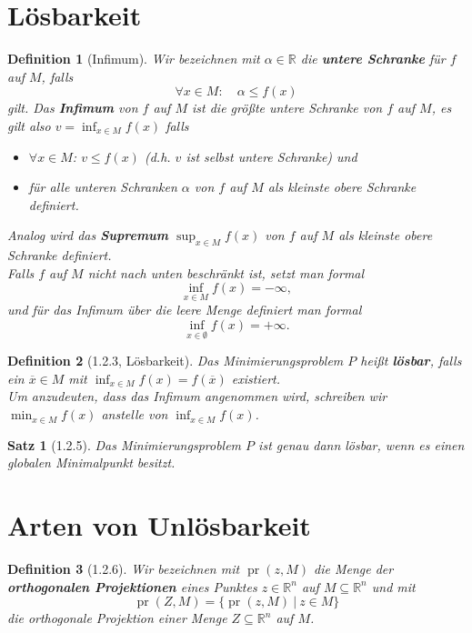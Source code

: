 \documentclass[12pt]{extreport} %
\newcommand{\R}{\mathbb{R}}
\theoremstyle{named}
\theoremstyle{nnamed}
\theoremstyle{itshape}
\newtheorem*{satz}{Satz}
\newtheorem*{definition}{Definition}
\theoremstyle{normal}
\begin{document}
\newpage

\section{Lösbarkeit}

\begin{definition}[Infimum]
	Wir bezeichnen mit $\alpha \in \R$ die \textbf{untere Schranke} für $f$ auf $M$, falls
	$$ \forall x \in M: \quad \alpha \leq f(x) $$
	gilt. Das \textbf{Infimum} von $f$ auf $M$ ist die größte untere Schranke von $f$ auf $M$, es gilt also $v = \inf_{x \in M} f(x)$ falls
	\begin{itemize}
		\item $\forall x \in M$: $v \leq f(x)$ (d.h. $v$ ist selbst untere Schranke) und
		\item für alle unteren Schranken $\alpha$ von $f$ auf $M$ als kleinste obere Schranke definiert.
	\end{itemize}
	Analog wird das \textbf{Supremum} $\sup_{x \in M} f(x)$ von $f$ auf $M$ als kleinste obere Schranke definiert. ~\\
	
	Falls $f$ auf $M$ nicht nach unten beschränkt ist, setzt man formal
	$$ \inf_{x \in M} f(x) = - \infty, $$
	und für das Infimum über die leere Menge definiert man formal
	$$ \inf_{x \in \emptyset} f(x) = +\infty. $$
\end{definition}

\begin{definition}[1.2.3, Lösbarkeit]
	Das Minimierungsproblem $P$ heißt \textbf{lösbar}, falls ein $\overline{x} \in M$ mit $\inf_{x \in M} f(x) = f(\overline{x})$ existiert. ~\\
	
	Um anzudeuten, dass das Infimum angenommen wird, schreiben wir $\min_{x \in M} f(x)$ anstelle von $\inf_{x \in M} f(x)$.
\end{definition}

\begin{satz}[1.2.5]
	Das Minimierungsproblem $P$ ist genau dann lösbar, wenn es einen globalen Minimalpunkt besitzt.
\end{satz}

\newpage

\section{Arten von Unlösbarkeit}

\begin{definition}[1.2.6]
	Wir bezeichnen mit $\operatorname{pr}(z, M)$ die Menge der \textbf{orthogonalen Projektionen} eines Punktes $z \in \R^n$ auf $M \subseteq \R^n$ und mit
	$$ \operatorname{pr}(Z, M) = \big\{ \operatorname{pr}(z, M) ~|~ z \in M \big\} $$
	die orthogonale Projektion einer Menge $Z \subseteq \R^n$ auf $M$.
\end{definition}
\end{document}
